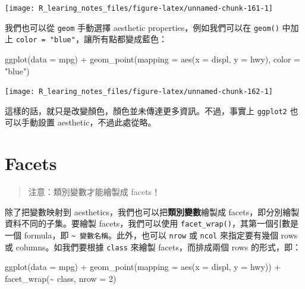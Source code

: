 \documentclass[
]{book}
\newenvironment{Shaded}{\begin{snugshade}}{\end{snugshade}}
\newcommand{\AttributeTok}[1]{\textcolor[rgb]{0.77,0.63,0.00}{#1}}
\newcommand{\DecValTok}[1]{\textcolor[rgb]{0.00,0.00,0.81}{#1}}
\newcommand{\FunctionTok}[1]{\textcolor[rgb]{0.00,0.00,0.00}{#1}}
\newcommand{\NormalTok}[1]{#1}
\newcommand{\SpecialCharTok}[1]{\textcolor[rgb]{0.00,0.00,0.00}{#1}}
\newcommand{\StringTok}[1]{\textcolor[rgb]{0.31,0.60,0.02}{#1}}
\theoremstyle{definition}
\theoremstyle{remark}
\begin{document}
\begin{center}\texttt{[image: R\_learing\_notes\_files/figure-latex/unnamed-chunk-161-1]} \end{center}

我們也可以從 \texttt{geom} 手動選擇 aesthetic properties，例如我們可以在 \texttt{geom()} 中加上 \texttt{color\ =\ "blue"}，讓所有點都變成藍色：

\begin{Shaded}
\begin{Highlighting}[]
\FunctionTok{ggplot}\NormalTok{(}\AttributeTok{data =}\NormalTok{ mpg) }\SpecialCharTok{+} \FunctionTok{geom\_point}\NormalTok{(}\AttributeTok{mapping =} \FunctionTok{aes}\NormalTok{(}\AttributeTok{x =}\NormalTok{ displ, }\AttributeTok{y =}\NormalTok{ hwy), }\AttributeTok{color =} \StringTok{"blue"}\NormalTok{)}
\end{Highlighting}
\end{Shaded}

\begin{center}\texttt{[image: R\_learing\_notes\_files/figure-latex/unnamed-chunk-162-1]} \end{center}

這樣的話，就只是改變顏色，顏色並未傳達更多資訊。不過，事實上 \texttt{ggplot2} 也可以手動設置 aesthetic，不過此處從略。

\hypertarget{facets}{%
\section{Facets}\label{facets}}

\begin{quote}
注意：類別變數才能繪製成 facets！
\end{quote}

除了把變數映射到 aesthetics，我們也可以把\textbf{類別變數}繪製成 facets，即分別繪製資料不同的子集。要繪製 facets，我們可以使用 \texttt{facet\_wrap()}，其第一個引數是一個 formula，即 \texttt{\textasciitilde{}\ 變數名稱}。此外，也可以 \texttt{nrow} 或 \texttt{ncol} 來指定要有幾個 rows 或 columns。如我們要根據 \texttt{class} 來繪製 facets，而排成兩個 rows 的形式，即：

\begin{Shaded}
\begin{Highlighting}[]
\FunctionTok{ggplot}\NormalTok{(}\AttributeTok{data =}\NormalTok{ mpg) }\SpecialCharTok{+}
      \FunctionTok{geom\_point}\NormalTok{(}\AttributeTok{mapping =} \FunctionTok{aes}\NormalTok{(}\AttributeTok{x =}\NormalTok{ displ, }\AttributeTok{y =}\NormalTok{ hwy)) }\SpecialCharTok{+}
      \FunctionTok{facet\_wrap}\NormalTok{(}\SpecialCharTok{\textasciitilde{}}\NormalTok{ class, }\AttributeTok{nrow =} \DecValTok{2}\NormalTok{)}
\end{Highlighting}
\end{Shaded}
\end{document}
